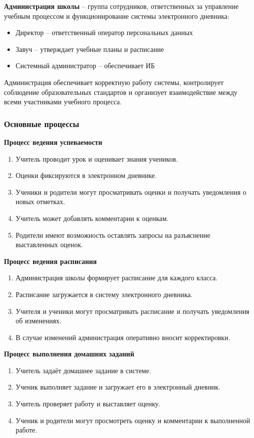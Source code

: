 \documentclass[a4paper, final]{article}
\begin{document}
\textbf{Администрация школы} -- группа сотрудников, ответственных за управление учебным процессом и функционирование системы электронного дневника:
\begin{itemize}
  \item Директор -- ответственный оператор персональных данных
  \item Завуч -- утверждает учебные планы и расписание
  \item Системный администратор -- обеспечивает ИБ
\end{itemize}

Администрация обеспечивает корректную работу системы, контролирует соблюдение образовательных стандартов и организует взаимодействие между всеми участниками учебного процесса.

\subsubsection{Основные процессы}
\noindent \textbf{Процесс ведения успеваемости}
\begin{enumerate}
  \item Учитель проводит урок и оценивает знания учеников.
  \item Оценки фиксируются в электронном дневнике.
  \item Ученики и родители могут просматривать оценки и получать уведомления о новых отметках.
  \item Учитель может добавлять комментарии к оценкам.
  \item Родители имеют возможность оставлять запросы на разъяснение выставленных оценок.
\end{enumerate}

\noindent \textbf{Процесс ведения расписания}
\begin{enumerate}
  \item Администрация школы формирует расписание для каждого класса.
  \item Расписание загружается в систему электронного дневника.
  \item Учителя и ученики могут просматривать расписание и получать уведомления об изменениях.
  \item В случае изменений администрация оперативно вносит корректировки.
\end{enumerate}

\noindent \textbf{Процесс выполнения домашних заданий}
\begin{enumerate}
  \item Учитель задаёт домашнее задание в системе.
  \item Ученик выполняет задание и загружает его в электронный дневник.
  \item Учитель проверяет работу и выставляет оценку.
  \item Ученик и родители могут просмотреть оценку и комментарии к выполненной работе.
\end{enumerate}
\end{document}
